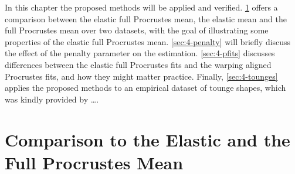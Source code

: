 \label{sec:4}
In this chapter the proposed methods will be applied and verified.
\cref{sec:4-means} offers a comparison between the elastic full Procrustes mean, the elastic mean and the full Procrustes mean over two datasets, with the goal of illustrating some properties of the elastic full Procrustes mean.
\cref{sec:4-penalty} will briefly discuss the effect of the penalty parameter on the estimation.
\cref{sec:4-pfits} discusses differences between the elastic full Procrustes fits and the warping aligned Procrustes fits, and how they might matter practice.
Finally, \cref{sec:4-tounges} applies the proposed methods to an empirical dataset of tounge shapes, which was kindly provided by \dots.


\section{Comparison to the Elastic and the Full Procrustes Mean}
\label{sec:4-means}


